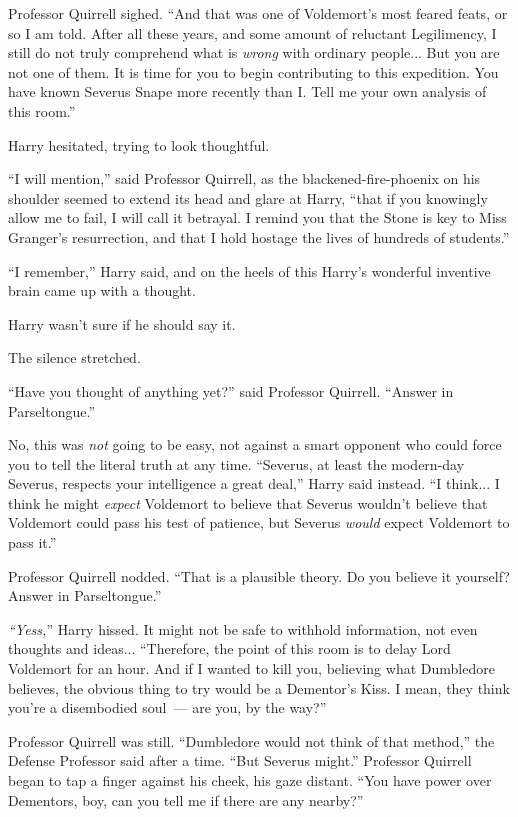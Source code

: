 Professor Quirrell sighed. ``And that was one of Voldemort's most feared feats, or so I am told. After all these years, and some amount of reluctant Legilimency, I still do not truly comprehend what is \emph{wrong} with ordinary people... But you are not one of them. It is time for you to begin contributing to this expedition. You have known Severus Snape more recently than I. Tell me your own analysis of this room.''

Harry hesitated, trying to look thoughtful.

``I will mention,'' said Professor Quirrell, as the blackened-fire-phoenix on his shoulder seemed to extend its head and glare at Harry, ``that if you knowingly allow me to fail, I will call it betrayal. I remind you that the Stone is key to Miss Granger's resurrection, and that I hold hostage the lives of hundreds of students.''

``I remember,'' Harry said, and on the heels of this Harry's wonderful inventive brain came up with a thought.

Harry wasn't sure if he should say it.

The silence stretched.

``Have you thought of anything yet?'' said Professor Quirrell. ``Answer in Parseltongue.''

No, this was \emph{not} going to be easy, not against a smart opponent who could force you to tell the literal truth at any time. ``Severus, at least the modern-day Severus, respects your intelligence a great deal,'' Harry said instead. ``I think... I think he might \emph{expect} Voldemort to believe that Severus wouldn't believe that Voldemort could pass his test of patience, but Severus \emph{would} expect Voldemort to pass it.''

Professor Quirrell nodded. ``That is a plausible theory. Do you believe it yourself? Answer in Parseltongue.''

\emph{``Yess,}'' Harry hissed. It might not be safe to withhold information, not even thoughts and ideas... ``Therefore, the point of this room is to delay Lord Voldemort for an hour. And if I wanted to kill you, believing what Dumbledore believes, the obvious thing to try would be a Dementor's Kiss. I mean, they think you're a disembodied soul~--- are you, by the way?''

Professor Quirrell was still. ``Dumbledore would not think of that method,'' the Defense Professor said after a time. ``But Severus might.'' Professor Quirrell began to tap a finger against his cheek, his gaze distant. ``You have power over Dementors, boy, can you tell me if there are any nearby?''

